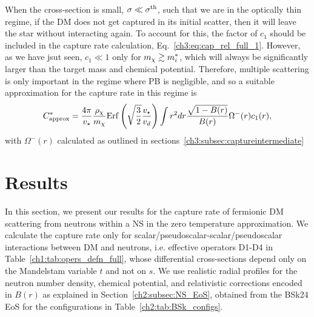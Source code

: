 When the cross-section is small, $\sigma\ll\sigma^{\rm th}$, such that we are in the optically thin regime, if the DM does not get captured in its initial scatter, then it will leave the star without interacting again. To account for this, the factor of $c_1$ should be included in the capture rate calculation, Eq.~\ref{ch3:eq:cap_rel_full_1}. However, as we have jsut seen, $c_1\ll1$ only for $m_\chi\gtrsim m_i^*$, which will always be significantly larger than the target mass and chemical potential. Therefore, multiple scattering is only important in the regime where PB is negligible, and so a suitable approximation for the capture rate in this regime is
\begin{equation}
    C_\mathrm{approx}^* = \frac{4\pi}{v_\star}\frac{\rho_\chi}{m_\chi}{\rm Erf}\left(\sqrt{\frac{3}{2}}\frac{v_\star}{v_d}\right)  \int  r^2 dr  \frac{\sqrt{1-B(r)}}{B(r)}\Omega^{-}(r) c_1(r),
    \label{ch3:eq:capturesimplelargem}
\end{equation}
with $\Omega^-(r)$ calculated as outlined in sections~\ref{ch3:subsec:captureintermediate}
    
\section{Results}
\label{ch3:sec:results}


In this section, we present our results for the capture rate of fermionic DM scattering from neutrons within a NS in the zero temperature approximation. We calculate the capture rate only for scalar/pseudoscalar-scalar/pseudoscalar interactions between DM and neutrons, i.e. effective operators D1-D4 in Table~\ref{ch1:tab:opers_defn_full}, whose differential cross-sections depend only on the Mandelstam variable $t$ and not on $s$. 
We use realistic radial profiles for the neutron number density, chemical potential, and relativistic corrections encoded in $B(r)$ as explained in Section~\ref{ch2:subsec:NS_EoS}, obtained from the BSk24 EoS for the configurations in Table~\ref{ch2:tab:BSk_configs}. 



